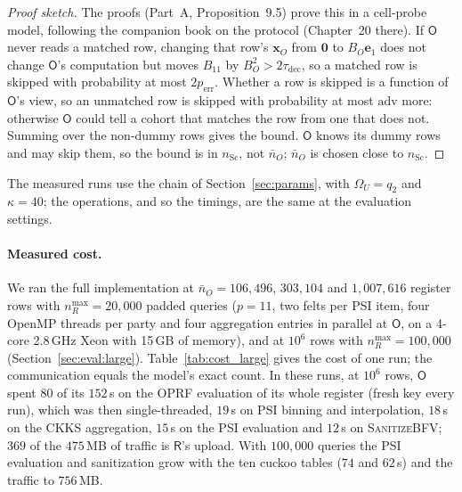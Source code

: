 \documentclass[11pt]{article}
\theoremstyle{definition}
\theoremstyle{plain}
\newcommand{\bx}{\mathbf{x}}
\newcommand{\Party}[1]{\textsf{#1}}
\newcommand{\Rp}{\Party{R}}
\newcommand{\Op}{\Party{O}}
\begin{document}
\begin{proof}[Proof sketch]
The proofs (Part~A, Proposition~9.5) prove this in a cell-probe model, following the companion book on the protocol (Chapter~20 there). If $\Op$ never reads a matched row, changing that row's $\bx_O$ from $\mathbf 0$ to $B_O\mathbf e_1$ does not change $\Op$'s computation but moves $B_{11}$ by $B_O^2 > 2\tau_{\mathrm{dec}}$, so a matched row is skipped with probability at most $2p_{\mathrm{err}}$. Whether a row is skipped is a function of $\Op$'s view, so an unmatched row is skipped with probability at most $\mathrm{adv}$ more: otherwise $\Op$ could tell a cohort that matches the row from one that does not. Summing over the non-dummy rows gives the bound. $\Op$ knows its dummy rows and may skip them, so the bound is in $n_{\mathrm{Sc}}$, not $\bar n_O$; $\bar n_O$ is chosen close to $n_{\mathrm{Sc}}$.
\end{proof}

The measured runs use the chain of Section~\ref{sec:params}, with $\Omega_U = q_2$ and $\kappa = 40$; the operations, and so the timings, are the same at the evaluation settings.

\paragraph{Measured cost.} We ran the full implementation at $\bar n_O = 106{,}496$, $303{,}104$ and $1{,}007{,}616$ register rows with $n_R^{\max} = 20{,}000$ padded queries ($p = 11$, two felts per PSI item, four OpenMP threads per party and four aggregation entries in parallel at $\Op$, on a 4-core 2.8\,GHz Xeon with 15\,GB of memory), and at $10^6$ rows with $n_R^{\max} = 100{,}000$ (Section~\ref{sec:eval:large}). Table~\ref{tab:cost_large} gives the cost of one run; the communication equals the model's exact count. In these runs, at $10^6$ rows, $\Op$ spent $80$ of its $152$\,s on the OPRF evaluation of its whole register (fresh key every run), which was then single-threaded, $19$\,s on PSI binning and interpolation, $18$\,s on the CKKS aggregation, $15$\,s on the PSI evaluation and $12$\,s on \textsc{SanitizeBFV}; $369$ of the $475$\,MB of traffic is $\Rp$'s upload. With $100{,}000$ queries the PSI evaluation and sanitization grow with the ten cuckoo tables ($74$ and $62$\,s) and the traffic to $756$\,MB.
\end{document}
